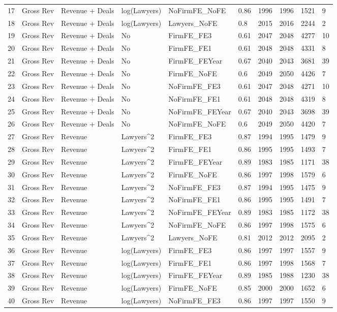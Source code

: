 \documentclass{article}
\begin{document}
\begin{table}[H]
\begin{tabular}{rlllllllll}
  17 & Gross Rev & Revenue + Deals & log(Lawyers) & NoFirmFE\_NoFE & 0.86 & 1996 & 1996 & 1521 & 9 \\ 
  18 & Gross Rev & Revenue + Deals & log(Lawyers) & Lawyers\_NoFE & 0.8 & 2015 & 2016 & 2244 & 2 \\ 
  19 & Gross Rev & Revenue + Deals & No & FirmFE\_FE3 & 0.61 & 2047 & 2048 & 4277 & 10 \\ 
  20 & Gross Rev & Revenue + Deals & No & FirmFE\_FE1 & 0.61 & 2048 & 2048 & 4331 & 8 \\ 
  21 & Gross Rev & Revenue + Deals & No & FirmFE\_FEYear & 0.67 & 2040 & 2043 & 3681 & 39 \\ 
  22 & Gross Rev & Revenue + Deals & No & FirmFE\_NoFE & 0.6 & 2049 & 2050 & 4426 & 7 \\ 
  23 & Gross Rev & Revenue + Deals & No & NoFirmFE\_FE3 & 0.61 & 2047 & 2048 & 4271 & 10 \\ 
  24 & Gross Rev & Revenue + Deals & No & NoFirmFE\_FE1 & 0.61 & 2048 & 2048 & 4319 & 8 \\ 
  25 & Gross Rev & Revenue + Deals & No & NoFirmFE\_FEYear & 0.67 & 2040 & 2043 & 3698 & 39 \\ 
  26 & Gross Rev & Revenue + Deals & No & NoFirmFE\_NoFE & 0.6 & 2049 & 2050 & 4420 & 7 \\ 
  27 & Gross Rev & Revenue & Lawyers^2 & FirmFE\_FE3 & 0.87 & 1994 & 1995 & 1479 & 9 \\ 
  28 & Gross Rev & Revenue & Lawyers^2 & FirmFE\_FE1 & 0.86 & 1995 & 1995 & 1493 & 7 \\ 
  29 & Gross Rev & Revenue & Lawyers^2 & FirmFE\_FEYear & 0.89 & 1983 & 1985 & 1171 & 38 \\ 
  30 & Gross Rev & Revenue & Lawyers^2 & FirmFE\_NoFE & 0.86 & 1997 & 1998 & 1579 & 6 \\ 
  31 & Gross Rev & Revenue & Lawyers^2 & NoFirmFE\_FE3 & 0.87 & 1994 & 1995 & 1475 & 9 \\ 
  32 & Gross Rev & Revenue & Lawyers^2 & NoFirmFE\_FE1 & 0.86 & 1995 & 1995 & 1491 & 7 \\ 
  33 & Gross Rev & Revenue & Lawyers^2 & NoFirmFE\_FEYear & 0.89 & 1983 & 1985 & 1172 & 38 \\ 
  34 & Gross Rev & Revenue & Lawyers^2 & NoFirmFE\_NoFE & 0.86 & 1997 & 1998 & 1575 & 6 \\ 
  35 & Gross Rev & Revenue & Lawyers^2 & Lawyers\_NoFE & 0.81 & 2012 & 2012 & 2095 & 2 \\ 
  36 & Gross Rev & Revenue & log(Lawyers) & FirmFE\_FE3 & 0.86 & 1997 & 1997 & 1557 & 9 \\ 
  37 & Gross Rev & Revenue & log(Lawyers) & FirmFE\_FE1 & 0.86 & 1997 & 1998 & 1568 & 7 \\ 
  38 & Gross Rev & Revenue & log(Lawyers) & FirmFE\_FEYear & 0.89 & 1985 & 1988 & 1230 & 38 \\ 
  39 & Gross Rev & Revenue & log(Lawyers) & FirmFE\_NoFE & 0.85 & 2000 & 2000 & 1652 & 6 \\ 
  40 & Gross Rev & Revenue & log(Lawyers) & NoFirmFE\_FE3 & 0.86 & 1997 & 1997 & 1550 & 9 \\ 
   \hline
\end{tabular}
\end{table}
\end{document}
